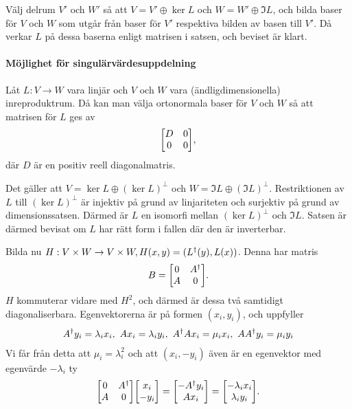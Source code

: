 \proof
Välj delrum $V'$ och $W'$ så att $V = V'\oplus\ker{L}$ och $W = W'\oplus\Im{L}$, och bilda baser för $V$ och $W$ som utgår från baser för $V'$ respektiva bilden av basen till $V'$. Då verkar $L$ på dessa baserna enligt matrisen i satsen, och beviset är klart.

\paragraph{Möjlighet för singulärvärdesuppdelning}
Låt $L: V\to W$ vara linjär och $V$ och $W$ vara (ändligdimensionella) inreproduktrum. Då kan man välja ortonormala baser för $V$ och $W$ så att matrisen för $L$ ges av
\begin{align*}
	\mqty[
		D & 0 \\
		0 & 0
	],
\end{align*}
där $D$ är en positiv reell diagonalmatris.

\proof
Det gäller att $V = \ker{L}\oplus (\ker{L})^{\perp}$ och $W = \Im{L}\oplus (\Im{L})^{\perp}$. Restriktionen av $L$ till $(\ker{L})^{\perp}$ är injektiv på grund av linjariteten och surjektiv på grund av dimensionssatsen. Därmed är $L$ en isomorfi mellan $(\ker{L})^{\perp}$ och $\Im{L}$. Satsen är därmed bevisat om $L$ har rätt form i fallen där den är inverterbar.

Bilda nu $H: V\times W\to V\times W, H(x, y) = (L^{\dagger}(y), L(x))$. Denna har matris
\begin{align*}
	B = 
	\mqty[
		0 & \adj{A} \\
		A & 0
	].
\end{align*}
$H$ kommuterar vidare med $H^{2}$, och därmed är dessa två samtidigt diagonaliserbara. Egenvektorerna är på formen $(x_{i}, y_{i})$, och uppfyller
\begin{align*}
	\adj{A}y_{i} = \lambda_{i}x_{i},\ Ax_{i} = \lambda_{i}y_{i},\ \adj{A}Ax_{i} = \mu_{i}x_{i},\ A\adj{A}y_{i} = \mu_{i}y_{i}
\end{align*}
Vi får från detta att $\mu_{i} = \lambda_{i}^{2}$ och att $(x_{i}, -y_{i})$ även är en egenvektor med egenvärde $-\lambda_{i}$ ty
\begin{align*}
	\mqty[
		0 & \adj{A} \\
		A & 0
	]
	\mqty[
		x_{i} \\
		-y_{i}
	]
	=
	\mqty[
		-\adj{A}y_{i} \\
		Ax_{i}
	]
	=
	\mqty[
		-\lambda_{i}x_{i} \\
		\lambda_{i}y_{i}
	].
\end{align*}


